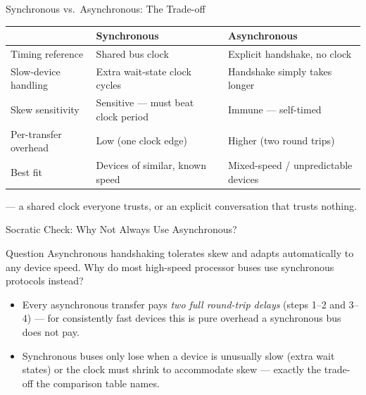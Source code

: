 \documentclass[aspectratio=169]{beamer}
\begin{document}
\begin{frame}{Synchronous vs.\ Asynchronous: The Trade-off}
  \footnotesize
  \begin{tabular}{@{}lll@{}}
    \toprule
    & \textbf{Synchronous} & \textbf{Asynchronous} \\
    \midrule
    Timing reference & Shared bus clock & Explicit handshake, no clock \\
    Slow-device handling & Extra wait-state clock cycles & Handshake simply takes longer \\
    Skew sensitivity & Sensitive --- must beat clock period & Immune --- self-timed \\
    Per-transfer overhead & Low (one clock edge) & Higher (two round trips) \\
    Best fit & Devices of similar, known speed & Mixed-speed / unpredictable devices \\
    \bottomrule
  \end{tabular}
  \vspace{0.3cm}
   --- a shared clock
  everyone trusts, or an explicit conversation that trusts nothing.
\end{frame}

\begin{frame}{Socratic Check: Why Not Always Use Asynchronous?}
  \begin{alertblock}{Question}
    Asynchronous handshaking tolerates skew and adapts automatically to any
    device speed. Why do most high-speed processor buses use synchronous
    protocols instead?
  \end{alertblock}
  \begin{itemize}
    \item Every asynchronous transfer pays \emph{two full round-trip delays}
      (steps 1--2 and 3--4) --- for consistently fast devices this is pure
      overhead a synchronous bus does not pay.
    \item Synchronous buses only lose when a device is unusually slow (extra
      wait states) or the clock must shrink to accommodate skew --- exactly
      the trade-off the comparison table names.
  \end{itemize}
\end{frame}


\end{document}
